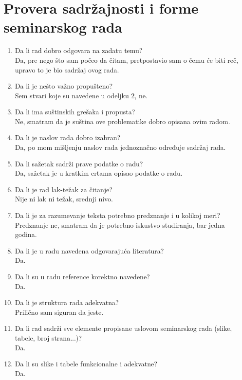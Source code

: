 \documentclass[a4paper]{report}
\begin{document}
\section{Provera sadržajnosti i forme seminarskog rada}

\begin{enumerate}
\item Da li rad dobro odgovara na zadatu temu?\\
Da, pre nego što sam počeo da čitam, pretpostavio sam o čemu će biti reč, upravo to je bio sadržaj ovog rada.

\item Da li je nešto važno propušteno?\\
Sem stvari koje su navedene u odeljku 2, ne.

\item Da li ima suštinskih grešaka i propusta?\\
Ne, smatram da je suština ove problematike dobro opisana ovim radom.

\item Da li je naslov rada dobro izabran?\\
Da, po mom mišljenju naslov rada jednoznačno određuje sadržaj rada.

\item Da li sažetak sadrži prave podatke o radu?\\
Da, sažetak je u kratkim crtama opisao podatke o radu.

\item Da li je rad lak-težak za čitanje?\\
Nije ni lak ni težak, srednji nivo.

\item Da li je za razumevanje teksta potrebno predznanje i u kolikoj meri?\\
Predznanje ne, smatram da je potrebno iskustvo studiranja, bar jedna godina.

\item Da li je u radu navedena odgovarajuća literatura?\\
Da.

\item Da li su u radu reference korektno navedene?\\
Da.

\item Da li je struktura rada adekvatna?\\
Prilično sam siguran da jeste.

\item Da li rad sadrži sve elemente propisane uslovom seminarskog rada (slike, tabele, broj strana...)?\\
Da.

\item Da li su slike i tabele funkcionalne i adekvatne?\\
Da.
\end{enumerate}
\end{document}
